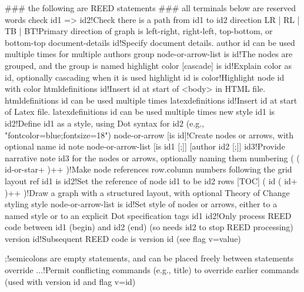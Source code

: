 ### the following are REED statements
### all terminals below are reserved words
check id1 => id2!Check there is a path from id1 to id2
direction {LR | RL | TB | BT}!Primary direction of graph is left-right, right-left, top-bottom, or bottom-top
document-details id!Specify document details. author id can be used multiple times for multiple authors
group node-or-arrow-list is id!The nodes are grouped, and the group is named
highlight color [cascade] is id!Explain color as id, optionally cascading when it is used
highlight id is color!Highlight node id with color
htmldefinitions id!Insert id at start of <body> in HTML file. htmldefinitions id can be used multiple times
latexdefinitions id!Insert id at start of Latex file. latexdefinitions id can be used multiple times
new style id1 is id2!Define id1 as a style, using Dot syntax for id2 (e.g., "fontcolor=blue;fontsize=18")
node-or-arrow [is id]!Create nodes or arrows, with optional name id
note node-or-arrow-list [is id1 [;]] [author id2 [;]] id3!Provide narrative note id3 for the nodes or arrows, optionally naming them
numbering ( {( id-or-star+ )}++ )!Make node references row.column numbers following the grid layout
ref id1 is id2!Set the reference of node id1 to be id2
rows [TOC] ( {id ( id+ )}++ )!Draw a graph with a structured layout, with optional Theory of Change styling
style node-or-arrow-list is id!Set style of nodes or arrows, either to a named style or to an explicit Dot specification
tags id1 id2!Only process REED code between id1 (begin) and id2 (end) (so needs id2 to stop REED processing)
version id!Subsequent REED code is version id (see flag v=value)

;!semicolons are empty statements, and can be placed freely between statements
override ...!Permit conflicting commands (e.g., title) to override earlier commands (used with version id and flag v=id)



